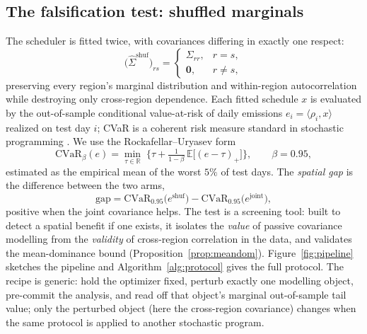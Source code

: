 \documentclass[12pt]{article}
\newcommand{\CVaR}{\mathrm{CVaR}}
\newcommand{\R}{\mathbb{R}}
\newcommand{\E}{\mathbb{E}}
\begin{document}
\subsection{The falsification test: shuffled marginals}\label{sec:test}
The scheduler is fitted twice, with covariances differing in exactly one respect:
\begin{equation}
\big(\hat\Sigma^{\mathrm{shuf}}\big)_{rs}=
\begin{cases}
\Sigma_{rr}, & r=s,\\
\mathbf{0}, & r\neq s,
\end{cases}
\label{eq:shuf}
\end{equation}
preserving every region's marginal distribution and within-region autocorrelation
while destroying only cross-region dependence. Each fitted schedule $x$ is evaluated
by the out-of-sample conditional value-at-risk of daily emissions
$e_i=\langle\rho_i,x\rangle$ realized on test day $i$; CVaR is a coherent risk
measure \citep{artzner1999} standard in stochastic programming
\citep{shapiro2009}. We use the Rockafellar--Uryasev form \citep{rockafellar2000}
\begin{equation}
\CVaR_{\beta}(e)=\min_{\tau\in\R}\;\Big\{\tau+\tfrac{1}{1-\beta}\,
\E\big[(e-\tau)_+\big]\Big\},
\qquad\beta=0.95,
\label{eq:cvar}
\end{equation}
estimated as the empirical mean of the worst $5\%$ of test days. The \emph{spatial
gap} is the difference between the two arms,
\begin{equation}
\mathrm{gap}=\CVaR_{0.95}\big(e^{\mathrm{shuf}}\big)-
\CVaR_{0.95}\big(e^{\mathrm{joint}}\big),
\label{eq:gap}
\end{equation}
positive when the joint covariance helps. The test is a screening tool: built to
detect a spatial benefit if one exists, it isolates the \emph{value} of passive
covariance modelling from the \emph{validity} of cross-region correlation in the data, and
validates the mean-dominance bound (Proposition~\ref{prop:meandom}).
Figure~\ref{fig:pipeline} sketches the pipeline and Algorithm~\ref{alg:protocol}
gives the full protocol. The recipe is generic: hold the optimizer fixed, perturb
exactly one modelling object, pre-commit the analysis, and read off that object's
marginal out-of-sample tail value; only the perturbed object (here the cross-region
covariance) changes when the same protocol is applied to another stochastic program.
\end{document}
